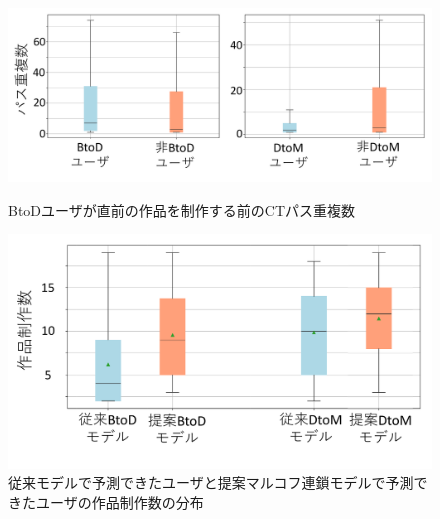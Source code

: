 \documentclass[submit,ses,noauthor]{ipsj}
\begin{document}


\begin{figure}[t]
	\centering
	\includegraphics[width=1\linewidth]{Okamoto_fig/add-btod-dtom.pdf}
        \vspace{-7mm}
	\caption{BtoDユーザが直前の作品を制作する前のCTパス重複数}
	\label{fig:add-btod}

 \centering
	\includegraphics[width=0.75\linewidth]{Okamoto_fig/btod-dtom-path.pdf}
        \vspace{-4mm}
	\caption{従来モデルで予測できたユーザと提案マルコフ連鎖モデルで予測できたユーザの作品制作数の分布}
	\label{fig:btod-path}
\end{figure}
\end{document}
